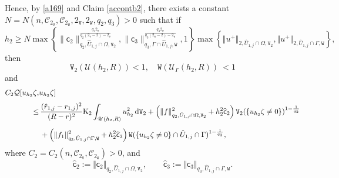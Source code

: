 \documentclass[reqno, 11pt, a4paper]{amsart}
\numberwithin{equation}{section}
\newcommand{\ops}{\mathcal{Q}}
\newcommand{\xv}{2_{\mathtt{V}}}
\newcommand{\xw}{2_{\mathtt{W}}}
\newcommand{\ck}{\textnormal K}
\newcommand{\fc}{\mathsf c}
\newcommand{\wghtv}{\mathtt{V}}
\newcommand{\wghtw}{\mathtt{W}}
\newcommand{\dwv}{\textnormal{d} \mathtt{V}}
\newcommand{\qxp}{q}
\begin{document}
Hence, by \eqref{a169} and Claim \ref{accontb2}, there exists a constant $N = N (  n , \mathcal C_{\xv} , \mathcal C_{\xw} , \xv , \xw , \qxp _2 , \qxp _3 ) >0 $ such that if  
$$
h_{2}\geq N \max \left\{   \|\fc _2 \|_{\qxp _2 , \hat U_{1,j} \cap \Omega , \wghtv _2} ^{\frac{\qxp _2 \xv }{\qxp _2 (\xv -2) - \xv}}   , \|\fc _3 \|_{\qxp _3 , \Gamma \cap \hat U_{1,j}, \wghtw} ^{\frac{\qxp _3 \xw }{\qxp _3 (\xw -2) - \xw}} , 1\right\}  \max \left\{ \Vert u^+ \Vert _{2 , \hat U _{1,j} \cap \Omega  , \wghtv _2 }  ,   \Vert  u^+ \Vert _{2 , \hat U _{1,j} \cap \Gamma , \wghtw }   \right\},
$$
then
\begin{equation}
\wghtv _2(\mathscr{U}(h_{2},R))<1 , \quad   \wghtw  ( \mathscr{U} _{\Gamma }  (h_{2},R)) \ <1 \label{aecontb5}
\end{equation}
and
\begin{equation} \label{aecontb4}
\begin{split} 
C_{2} \ops [ u_{h_{2}}  \zeta , &  u_{h_{2}}  \zeta] \\[3pt]
 \leq  & \displaystyle \,  \frac{ (\hat r _{1,j} - r_{1,j})^2}{(R-r) ^{2}} \ck _{2} \int _{\mathscr{U}(h_{2},R)} u_{h_{2}}  ^2   \, \dwv _{2}  +    \left(  \Vert f \Vert _{q_2 , \hat U _{1,j} \cap \Omega  , \wghtv _2 } ^2 + h_{2}^2 \widehat{\fc}_2 \right)  \wghtv _2 ( \{u_{h_{2}}  \zeta \neq 0\})^{1-\frac{1}{q_2}}  \\[5pt]
 & \displaystyle \, + \left(  \Vert f_1 \Vert _{q_3 ,\hat U _{1,j} \cap \Gamma , \wghtw} ^2 + h_{2}^2 \widehat{\fc}_3 \right) \wghtw (\{ u_{h_{2}}  \zeta \neq 0\}\cap \hat U _{1,j} \cap \Gamma)^{1-\frac{1}{q_3}} ,
\end{split}
\end{equation}
where $C_{2}=C_{2}(  n , \mathcal C_{\xv} , \mathcal C_{\xw}  )>0$, and
$$
\widehat{\fc}_2 :=\Vert \fc _2 \Vert _{q_2 , \hat U _{1,j} \cap \Omega  , \wghtv _2 } ,\qquad \widehat{\fc}_3 :=\Vert \fc _3 \Vert _{q_3 , \hat U _{1,j} \cap \Gamma  , \wghtw } .
$$
\end{document}
